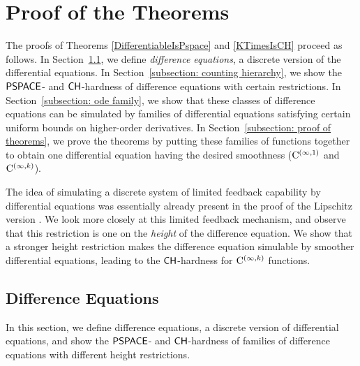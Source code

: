 \section{Proof of the Theorems}
\label{section:differentiable}

The proofs of Theorems \ref{DifferentiableIsPspace} and \ref{KTimesIsCH}
proceed as follows. 
In Section~\ref{section:divp}, 
we define \emph{difference equations}, 
a discrete version of the differential equations. 
In Section~\ref{subsection: counting hierarchy}, 
we show the $\mathsf{PSPACE}$- and $\mathsf{CH}$-hardness of 
difference equations with certain restrictions. 
In Section~\ref{subsection: ode family}, 
we show that these classes of difference equations can be simulated
by families of differential equations 
satisfying certain uniform bounds on higher-order derivatives. 
In Section~\ref{subsection: proof of theorems}, 
we prove the theorems by
putting these families of functions together 
to obtain one differential equation 
having the desired smoothness 
($\mathrm C ^{(\infty, 1)}$ and $\mathrm C ^{(\infty, k)}$). 

The idea of simulating a discrete system of limited feedback capability
by differential equations
was essentially already present in the proof of 
the Lipschitz version \cite{kawamura2010lipschitz}. 
We look more closely at this limited feedback mechanism, 
and observe that this restriction is one on the \emph{height}
of the difference equation. 
We show that a stronger height restriction makes
the difference equation simulable by 
smoother differential equations, 
leading to the $\mathsf{CH}$-hardness for $\mathrm C ^{(\infty, k)}$ functions.

\subsection{Difference Equations}
\label{section:divp}

In this section, we define difference equations, 
a discrete version of differential equations,
and show the $\mathsf{PSPACE}$- and $\mathsf{CH}$-hardness of 
families of difference equations with different height restrictions. 

